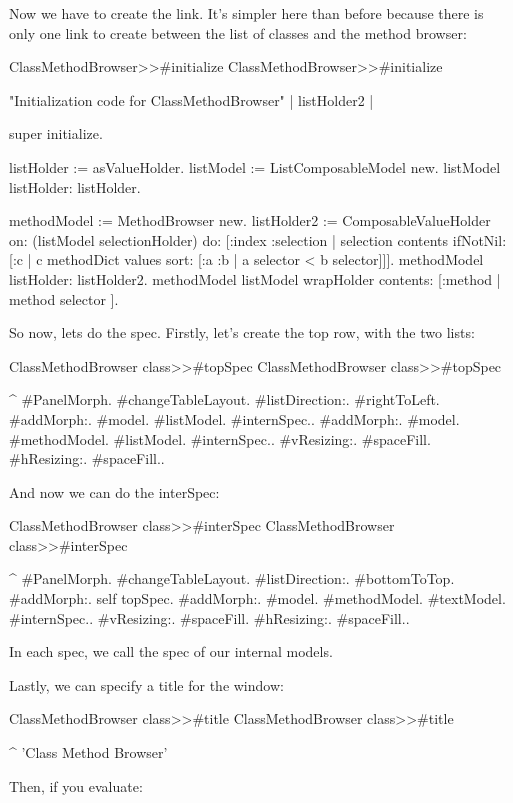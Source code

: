 \documentclass[a4paper,10pt,twoside]{book}
\begin{document}
Now we have to create the link. It's simpler here than before because there is only one link to create between the list of classes and the method browser:

\begin{method}{ClassMethodBrowser>>\#initialize}
ClassMethodBrowser>>#initialize

	"Initialization code for ClassMethodBrowser"
	| listHolder2 |
	
	super initialize.
	
	listHolder := {} asValueHolder.
	listModel := ListComposableModel new.
	listModel listHolder: listHolder.
	
	methodModel := MethodBrowser new.
	listHolder2 := ComposableValueHolder on: (listModel selectionHolder) do: [:index :selection | selection contents ifNotNil: [:c | c methodDict values sort: [:a :b | a selector < b selector]]].
	methodModel listHolder: listHolder2.
	methodModel listModel wrapHolder contents: [:method | method selector ].
\end{method}

So now, lets do the spec. Firstly, let's create the top row, with the two lists:
\begin{method}{ClassMethodBrowser class>>\#topSpec}
ClassMethodBrowser class>>#topSpec

	^{ #PanelMorph.
			#changeTableLayout.
			#listDirection:. #rightToLeft.
			#addMorph:. {#model. #listModel. #internSpec.}.
			#addMorph:. {#model. #methodModel. #listModel. #internSpec.}.
			#vResizing:. #spaceFill.
			#hResizing:. #spaceFill.}.
\end{method}

And now we can do the interSpec:

\begin{method}{ClassMethodBrowser class>>\#interSpec}
ClassMethodBrowser class>>#interSpec

	^ { #PanelMorph.
			#changeTableLayout.
			#listDirection:. #bottomToTop.
			#addMorph:. self topSpec.
			#addMorph:. {#model. #methodModel. #textModel. #internSpec.}.
			#vResizing:. #spaceFill.
			#hResizing:. #spaceFill.}.
\end{method}
In each spec, we call the spec of our internal models.

Lastly, we can specify a title for the window:
\begin{method}{ClassMethodBrowser class>>\#title}
ClassMethodBrowser class>>#title

	^ 'Class Method Browser'
\end{method}
Then, if you evaluate:
\end{document}
